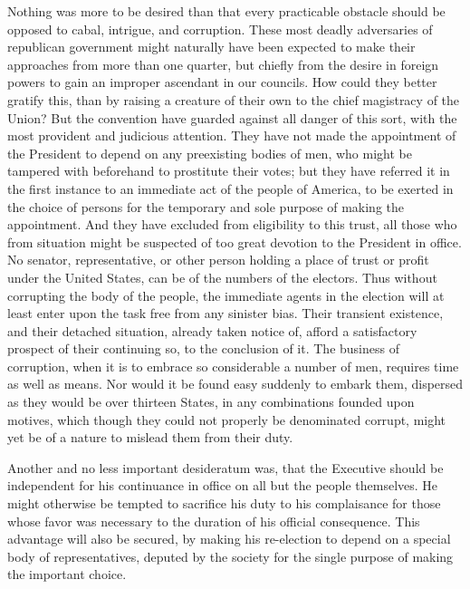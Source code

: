 Nothing was more to be desired than that every practicable obstacle should be opposed to cabal, intrigue, and corruption. These most deadly adversaries of republican government might naturally have been expected to make their approaches from more than one quarter, but chiefly from the desire in foreign powers to gain an improper ascendant in our councils. How could they better gratify this, than by raising a creature of their own to the chief magistracy of the Union? But the convention have guarded against all danger of this sort, with the most provident and judicious attention. They have not made the appointment of the President to depend on any preexisting bodies of men, who might be tampered with beforehand to prostitute their votes; but they have referred it in the first instance to an immediate act of the people of America, to be exerted in the choice of persons for the temporary and sole purpose of making the appointment. And they have excluded from eligibility to this trust, all those who from situation might be suspected of too great devotion to the President in office. No senator, representative, or other person holding a place of trust or profit under the United States, can be of the numbers of the electors. Thus without corrupting the body of the people, the immediate agents in the election will at least enter upon the task free from any sinister bias. Their transient existence, and their detached situation, already taken notice of, afford a satisfactory prospect of their continuing so, to the conclusion of it. The business of corruption, when it is to embrace so considerable a number of men, requires time as well as means. Nor would it be found easy suddenly to embark them, dispersed as they would be over thirteen States, in any combinations founded upon motives, which though they could not properly be denominated corrupt, might yet be of a nature to mislead them from their duty.

Another and no less important desideratum was, that the Executive should be independent for his continuance in office on all but the people themselves. He might otherwise be tempted to sacrifice his duty to his complaisance for those whose favor was necessary to the duration of his official consequence. This advantage will also be secured, by making his re-election to depend on a special body of representatives, deputed by the society for the single purpose of making the important choice.

